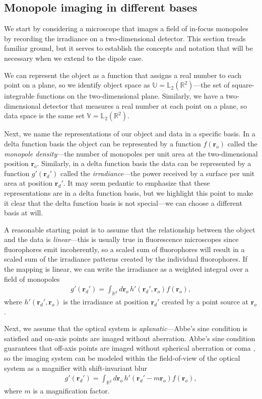 \documentclass[]{osa-article}
\providecommand{\ro}{\mathbf{\mathbf{r}}_o}
\providecommand{\rd}{\mathbf{r}_d}
\providecommand{\mbb}[1]{\mathbb{#1}}
\begin{document}
\subsection{Monopole imaging in different bases}\label{sec:monopole}
We start by considering a microscope that images a field of in-focus monopoles
by recording the irradiance on a two-dimensional detector. This section treads
familiar ground, but it serves to establish the concepts and notation that will
be necessary when we extend to the dipole case.

We can represent the object as a function that assigns a real number to each
point on a plane, so we identify object space as
$\mbb{U} = \mbb{L}_2(\mbb{R}^2)$---the set of square-integrable functions on the
two-dimensional plane. Similarly, we have a two-dimensional detector that
measures a real number at each point on a plane, so data space is the same set
$\mbb{V} = \mbb{L}_2(\mbb{R}^2)$.

Next, we name the representations of our object and data in a specific basis. In
a delta function basis the object can be represented by a function $f(\ro)$
called the \textit{monopole density}---the number of monopoles per unit area at
the two-dimensional position $\ro$. Similarly, in a delta function basis the
data can be represented by a function $g'(\rd')$ called the
\textit{irradiance}---the power received by a surface per unit area at position
$\rd'$. It may seem pedantic to emphasize that these representations are in a
delta function basis, but we highlight this point to make it clear that the
delta function basis is not special---we can choose a different basis at will.

A reasonable starting point is to assume that the relationship between the
object and the data is \textit{linear}---this is usually true in fluorescence
microscopes since fluorophores emit incoherently, so a scaled sum of
fluorophores will result in a scaled sum of the irradiance patterns created by
the individual fluorophores. If the mapping is linear, we can write the
irradiance as a weighted integral over a field of monopoles
\begin{align}
g'(\rd') = \int_{\mbb{R}^2}d\ro\, h'(\rd',\ro)f(\ro), \label{eq:fwdmono}
\end{align}
where $h'(\rd{}', \ro{})$ is the irradiance at position $\rd'$ created by a
point source at $\ro$.

Next, we assume that the optical system is \textit{aplanatic}---Abbe's sine
condition is satisfied and on-axis points are imaged without aberration. Abbe's
sine condition guarantees that off-axis points are imaged without spherical
aberration or coma \cite{mansuripur2009}, so the imaging system can be modeled
within the field-of-view of the optical system as a magnifier with
shift-invariant blur
\begin{align}
  g'(\rd') = \int_{\mbb{R}^2}d\ro\, h'(\rd' - m\ro)f(\ro), \label{eq:nonconv}
\end{align}
where $m$ is a magnification factor. 
\end{document}
